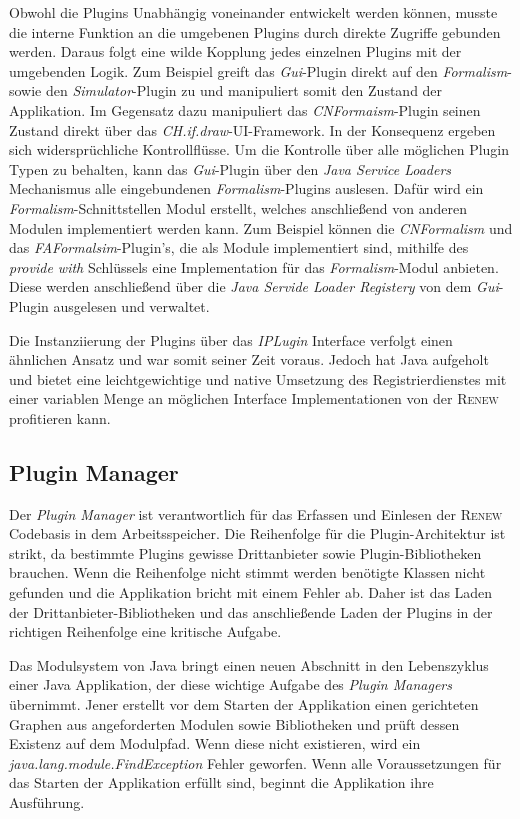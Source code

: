 		Obwohl die Plugins Unabhängig voneinander entwickelt werden können, musste die interne Funktion an die umgebenen Plugins durch direkte Zugriffe gebunden werden. Daraus folgt eine wilde Kopplung jedes einzelnen Plugins mit der umgebenden Logik. Zum Beispiel greift das \textit{Gui}-Plugin direkt auf den \textit{Formalism}- sowie den \textit{Simulator}-Plugin zu und manipuliert somit den Zustand der Applikation. Im Gegensatz dazu manipuliert das \textit{CNFormaism}-Plugin seinen Zustand direkt über das \textit{CH.if.draw}-UI-Framework. In der Konsequenz ergeben sich widersprüchliche Kontrollflüsse.\newline  
		Um die Kontrolle über alle möglichen Plugin Typen zu behalten, kann das \textit{Gui}-Plugin über den \textit{Java Service Loaders} Mechanismus alle eingebundenen \textit{Formalism}-Plugins auslesen. Dafür wird ein \textit{Formalism}-Schnittstellen Modul erstellt, welches anschließend von anderen Modulen implementiert werden kann. Zum Beispiel können die \textit{CNFormalism} und das \textit{FAFormalsim}-Plugin's, die als Module implementiert sind, mithilfe des \textit{provide with} Schlüssels eine Implementation für das \textit{Formalism}-Modul anbieten. Diese werden anschließend über die \textit{Java Servide Loader Registery} von dem \textit{Gui}-Plugin ausgelesen und verwaltet. \bigbreak

		Die Instanziierung der Plugins über das \textit{IPLugin} Interface verfolgt einen ähnlichen Ansatz und war somit seiner Zeit voraus. Jedoch hat Java aufgeholt und bietet eine leichtgewichtige und native Umsetzung des Registrierdienstes mit einer variablen Menge an möglichen Interface Implementationen von der \textsc{Renew} profitieren kann.   

	\subsection{Plugin Manager}
		Der \textit{Plugin Manager} ist verantwortlich für das Erfassen und Einlesen der \textsc{Renew} Codebasis in dem Arbeitsspeicher. Die Reihenfolge für die Plugin-Architektur ist strikt, da bestimmte Plugins gewisse Drittanbieter sowie Plugin-Bibliotheken brauchen. Wenn die Reihenfolge nicht stimmt werden benötigte Klassen nicht gefunden und die Applikation bricht mit einem Fehler ab. Daher ist das Laden der Drittanbieter-Bibliotheken und das anschließende Laden der Plugins in der richtigen Reihenfolge eine kritische Aufgabe. \bigbreak

		Das Modulsystem von Java bringt einen neuen Abschnitt in den Lebenszyklus einer Java Applikation, der diese wichtige Aufgabe des \textit{Plugin Managers} übernimmt. Jener erstellt vor dem Starten der Applikation einen gerichteten Graphen aus angeforderten Modulen sowie Bibliotheken und prüft dessen Existenz auf dem Modulpfad. Wenn diese nicht existieren, wird ein \textit{java.lang.module.FindException} Fehler geworfen. Wenn alle Voraussetzungen für das Starten der Applikation erfüllt sind, beginnt die Applikation ihre Ausführung. \bigbreak

